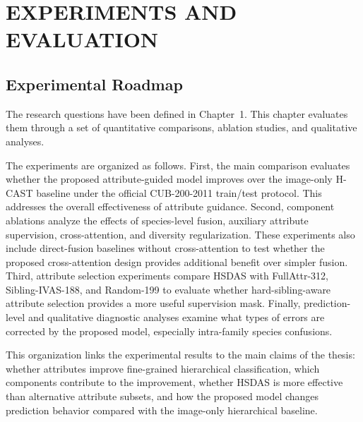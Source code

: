 \chapter{EXPERIMENTS AND EVALUATION}
\label{chap:experiment}

\section{Experimental Roadmap}

The research questions have been defined in Chapter~1. This chapter evaluates them through a set of quantitative comparisons, ablation studies, and qualitative analyses.

The experiments are organized as follows. First, the main comparison evaluates whether the proposed attribute-guided model improves over the image-only H-CAST baseline under the official CUB-200-2011 train/test protocol. This addresses the overall effectiveness of attribute guidance. Second, component ablations analyze the effects of species-level fusion, auxiliary attribute supervision, cross-attention, and diversity regularization. These experiments also include direct-fusion baselines without cross-attention to test whether the proposed cross-attention design provides additional benefit over simpler fusion. Third, attribute selection experiments compare HSDAS with FullAttr-312, Sibling-IVAS-188, and Random-199 to evaluate whether hard-sibling-aware attribute selection provides a more useful supervision mask. Finally, prediction-level and qualitative diagnostic analyses examine what types of errors are corrected by the proposed model, especially intra-family species confusions.

This organization links the experimental results to the main claims of the thesis: whether attributes improve fine-grained hierarchical classification, which components contribute to the improvement, whether HSDAS is more effective than alternative attribute subsets, and how the proposed model changes prediction behavior compared with the image-only hierarchical baseline.

